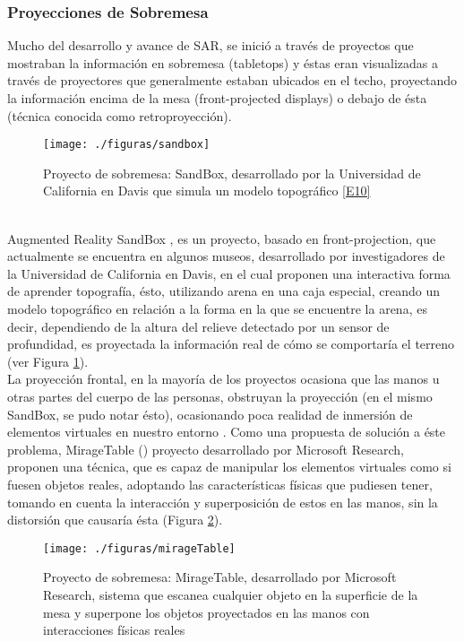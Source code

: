 \documentclass[a4paper,openright,12pt]{report}
\begin{document}
\subsubsection{Proyecciones de Sobremesa}
Mucho del desarrollo y avance de SAR, se inició a través de proyectos que mostraban la información en sobremesa (tabletops) y éstas eran visualizadas a través de proyectores que generalmente estaban ubicados en el techo, proyectando la información encima de la mesa (front-projected displays) o debajo de ésta (técnica conocida como retroproyección).
\begin{figure}[th]
	\centering
	\texttt{[image: ./figuras/sandbox]}
	\caption[Proyecto de sobremesa: SandBox]{Proyecto de sobremesa: SandBox, desarrollado por la Universidad de California en Davis que simula un modelo topográfico \hyperlink{e10}{[E10]} } \label{fig:sandbox}
\end{figure}\\
Augmented Reality SandBox \cite{kreylos2016}, es un proyecto, basado en front-projection, que actualmente se encuentra en algunos museos, desarrollado por investigadores de la Universidad de California en Davis, en el cual proponen una interactiva forma de aprender topografía, ésto, utilizando arena en una caja especial, creando un modelo topográfico en relación a la forma en la que se encuentre la arena, es decir, dependiendo de la altura del relieve detectado por un sensor de profundidad, es proyectada la información real de cómo se comportaría el terreno (ver Figura \ref{fig:sandbox}).\\
La proyección frontal, en la mayoría de los proyectos ocasiona que las manos u otras partes del cuerpo de las personas, obstruyan la proyección (en el mismo SandBox, se pudo notar ésto), ocasionando poca realidad de inmersión de elementos virtuales en nuestro entorno \citep[ejemplos de proyección frontal]{dietz2001,wilson2005,kreylos2016}. Como una propuesta de solución a éste problema, MirageTable (\cite{benko2012}) proyecto desarrollado por Microsoft Research\textregistered, proponen una técnica, que es capaz de manipular los elementos virtuales como si fuesen objetos reales, adoptando las características físicas que pudiesen tener, tomando en cuenta la interacción y superposición de estos en las manos, sin la distorsión que causaría ésta (Figura \ref{fig:mirageTable}).
\begin{figure}[th]
	\centering
	\texttt{[image: ./figuras/mirageTable]}
	\caption[Proyecto de sobremesa: MirageTable]{Proyecto de sobremesa: MirageTable, desarrollado por Microsoft Research\textregistered, sistema que escanea cualquier objeto en la superficie de la mesa y superpone los objetos proyectados en las manos con interacciones físicas reales \citep{benko2012}} \label{fig:mirageTable}
\end{figure}\\
\end{document}

